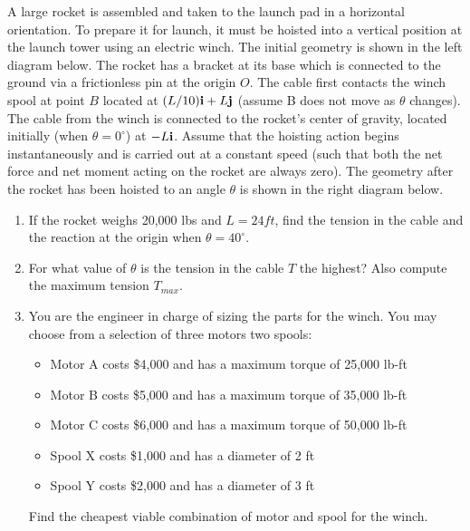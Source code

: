 
A large rocket is assembled and taken to the launch pad in a horizontal orientation. To prepare it for launch,
it must be hoisted into a vertical position at the launch tower using an electric winch. The initial geometry is
shown in the left diagram below. The rocket has a bracket at its base which is connected to the ground via
a frictionless pin at the origin $O$. The cable first contacts the winch spool at point $B$ located at $(L/10){\bf i} + L{\bf j}$
(assume B does not move as $\theta$ changes). The cable from the winch is connected to the rocket's center of gravity,
located initially (when $\theta = 0^\circ$) at $-L{\bf i}$. Assume that the hoisting action begins instantaneously and is carried
out at a constant speed (such that both the net force and net moment acting on the rocket are always zero).
The geometry after the rocket has been hoisted to an angle $\theta$ is shown in the right diagram below.
\begin{enumerate}
  \item If the rocket weighs 20,000 lbs and $L = 24 ft$, find the tension in the cable and the reaction at the origin when $\theta = 40^\circ$.
  \item For what value of $\theta$ is the tension in the cable $T$ the highest? Also compute the maximum tension $T_{max}$.
  \item You are the engineer in charge of sizing the parts for the winch. You may choose from a selection of three motors two spools:
  \begin{itemize}
	\item Motor A costs \$4,000 and has a maximum torque of 25,000 lb-ft
	\item Motor B costs \$5,000 and has a maximum torque of 35,000 lb-ft
	\item Motor C costs \$6,000 and has a maximum torque of 50,000 lb-ft
        \item Spool X costs \$1,000 and has a diameter of 2 ft
	\item Spool Y costs \$2,000 and has a diameter of 3 ft
  \end{itemize}
Find the cheapest viable combination of motor and spool for the winch.
\end{enumerate}

